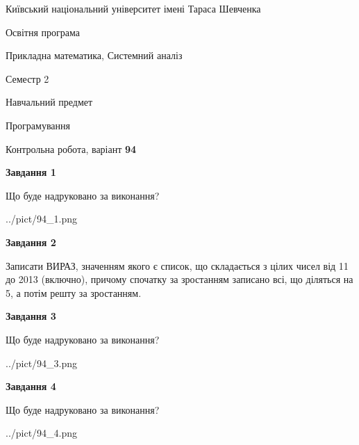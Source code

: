 \documentclass[12pt, ukrainian]{article}
\begin{document}
{{\begin {small}\par
{ \center  Київський національний університет імені Тараса Шевченка \par}
{\parbox {5 cm}{Освітня програма \hfill}{\parbox {8 cm}{Прикладна математика, Системний аналіз \hfill}}\parbox {5 cm}{\hfill Семестр 2}}\par
{\parbox {5 cm} {Навчальний предмет \hfill}\parbox {7 cm}{Програмування \hfill}\parbox {6cm}{\hfill}\par}\vspace{-7pt} \end{small}}{\center Контрольна робота, варіант  \No \textbf
{ 94 }\par}}
{
\begin {large}
{\begin {center}\textbf{Завдання 1}\end {center}}\par
Що буде надруковано за виконання?\par\par
\begin{center}
	{../pict/94_1.png}
\end{center}
\newpage

{\begin {center}\textbf{Завдання 2}\end {center}}\par

Записати ВИРАЗ, значенням якого є список, що складається з цілих чисел від 11 до 2013 (включно), причому спочатку за зростанням записано всі, що діляться на 5, а потім решту за зростанням.\par
\newpage

{\begin {center}\textbf{Завдання 3}\end {center}}\par
Що буде надруковано за виконання?\par
\begin{center}
	{../pict/94_3.png}
\end{center}
\newpage

{\begin {center}\textbf{Завдання 4}\end {center}}\par
Що буде надруковано за виконання?\par
\begin{center}
	{../pict/94_4.png}
\end{center}
\newpage


\end{large}}
\end{document}
